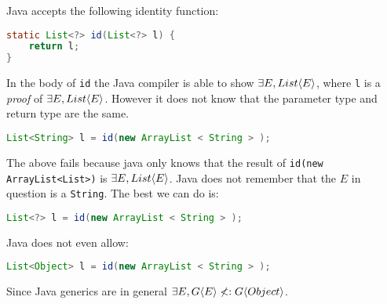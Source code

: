 \documentclass{article}
\begin{document}
\begin{example}
Java accepts the following identity function:
\begin{lstlisting}[language=Java]
static List<?> id(List<?> l) {
    return l;
}
\end{lstlisting}
In the body of \texttt{id} the Java compiler is able to show $\exists E, List \langle E \rangle$, where \texttt{l} is a \textit{proof} of $\exists E, List \langle E \rangle$.
However it does not know that the parameter type and return type are the same.
\begin{lstlisting}[language=Java]
List<String> l = id(new ArrayList < String > );
\end{lstlisting}
The above fails because java only knows that the result of \texttt{id(new ArrayList<List>)} is $\exists E, List \langle E \rangle$.
Java does not remember that the $E$ in question is a \texttt{String}.
The best we can do is:
\begin{lstlisting}[language=Java]
List<?> l = id(new ArrayList < String > );
\end{lstlisting}
Java does not even allow:
\begin{lstlisting}[language=Java]
List<Object> l = id(new ArrayList < String > );
\end{lstlisting}
Since Java generics are \textit{\invar{}} in general $\exists E, G \langle E \rangle \nless: G \langle Object \rangle$.
\end{example}
\end{document}
